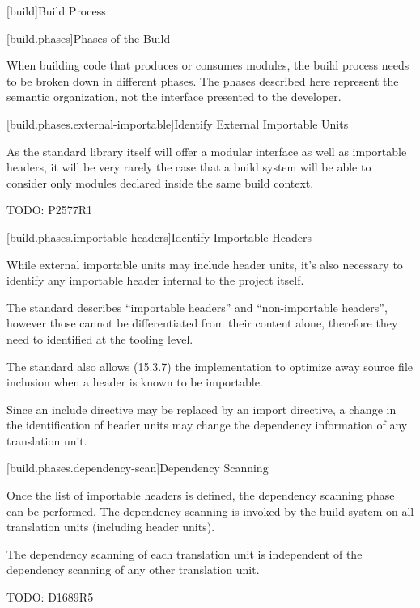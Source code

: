 
[build]{Build Process}

%

[build.phases]{Phases of the Build}

\pnum When building \Cpp{} code that produces or consumes modules, the
build process needs to be broken down in different phases. The phases
described here represent the semantic organization, not the interface
presented to the \Cpp{} developer.

[build.phases.external-importable]{Identify External Importable Units}

\pnum As the \Cpp{} standard library itself will offer a modular
interface as well as importable headers, it will be very rarely the
case that a build system will be able to consider only modules
declared inside the same build context.

\pnum TODO: P2577R1

[build.phases.importable-headers]{Identify Importable Headers}

\pnum While external importable units may include header units, it's
also necessary to identify any importable header internal to the
project itself.

\pnum The \Cpp{} standard describes ``importable headers'' and
``non-importable headers'', however those cannot be differentiated
from their content alone, therefore they need to identified at the
tooling level.

\pnum The \Cpp{} standard also allows (15.3.7) the implementation to
optimize away source file inclusion when a header is known to be
importable.

\pnum Since an include directive may be replaced by an import
directive, a change in the identification of header units may change
the dependency information of any translation unit.

[build.phases.dependency-scan]{Dependency Scanning}

\pnum Once the list of importable headers is defined, the dependency
scanning phase can be performed. The dependency scanning is invoked by
the build system on all translation units (including header units).

\pnum The dependency scanning of each translation unit is independent
of the dependency scanning of any other translation unit.

\pnum TODO: D1689R5

